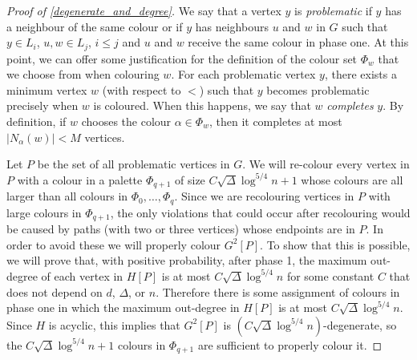 \documentclass{patmorin}
\newcommand{\defin}[1]{\emph{\color{brightmaroon}#1}}
\begin{document}
\begin{proof}[Proof of \cref{degenerate_and_degree}]

  We say that a vertex $y$ is \defin{problematic} if $y$ has a neighbour of the same colour or if $y$ has neighbours $u$ and $w$ in $G$ such that $y\in L_i$, $u,w\in L_j$, $i \le j$ and $u$ and $w$ receive the same colour in phase one.  At this point, we can offer some justification for the definition of the colour set $\Phi_w$ that we choose from when colouring $w$. For each problematic vertex $y$, there exists a minimum vertex $w$ (with respect to $<$) such that $y$ becomes problematic precisely when $w$ is coloured.  When this happens, we say that $w$ \defin{completes} $y$. By definition, if $w$ chooses the colour $\alpha\in\Phi_w$, then it completes at most $|N_{\alpha}(w)|<M$ vertices.



  Let $P$ be the set of all problematic vertices in $G$.  We will re-colour every vertex in $P$ with a colour in a palette $\Phi_{q+1}$ of size $C\sqrt{\Delta}\log^{5/4} n+1$ whose colours are all larger than all colours in $\Phi_0,\ldots,\Phi_q$.  Since we are recolouring vertices in $P$ with large colours in $\Phi_{q+1}$, the only violations that could occur after recolouring would be caused by paths (with two or three vertices) whose endpoints are in $P$.  In order to avoid these we will properly colour $G^2[P]$.  To show that this is possible, we will prove that, with positive probability, after phase 1, the maximum out-degree of each vertex in $H[P]$ is at most $C\sqrt{\Delta}\log^{5/4} n$ for some constant $C$ that does not depend on $d$, $\Delta$, or $n$.  Therefore there is some assignment of colours in phase one in which the maximum out-degree in $H[P]$ is at most $C\sqrt{\Delta}\log^{5/4} n$.  Since $H$ is acyclic, this implies that $G^2[P]$ is $(C\sqrt{\Delta}\log^{5/4} n)$-degenerate, so the $C\sqrt{\Delta}\log^{5/4} n+1$ colours in $\Phi_{q+1}$ are sufficient to properly colour it.


\end{proof}
\end{document}
